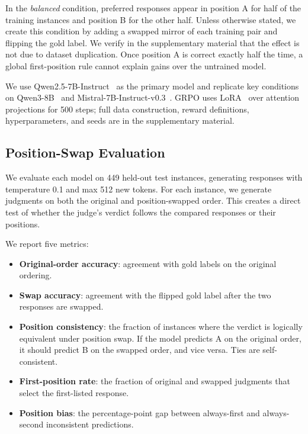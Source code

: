 \documentclass[letterpaper]{article}
\begin{document}
In the \emph{balanced} condition, preferred responses appear in position A for half of the training instances and position B for the other half. Unless otherwise stated, we create this condition by adding a swapped mirror of each training pair and flipping the gold label. We verify in the supplementary material that the effect is not due to dataset duplication. Once position A is correct exactly half the time, a global first-position rule cannot explain gains over the untrained model.

We use Qwen2.5-7B-Instruct~\citep{qwen2025qwen25} as the primary model and replicate key conditions on Qwen3-8B~\citep{qwen2025qwen3} and Mistral-7B-Instruct-v0.3~\citep{jiang2023mistral}. GRPO uses LoRA~\citep{hu2022lora} over attention projections for 500 steps; full data construction, reward definitions, hyperparameters, and seeds are in the supplementary material.

\subsection{Position-Swap Evaluation}

We evaluate each model on 449 held-out test instances, generating responses with temperature 0.1 and max 512 new tokens. For each instance, we generate judgments on both the original and position-swapped order. This creates a direct test of whether the judge's verdict follows the compared responses or their positions.

We report five metrics:
\begin{itemize}
\item \textbf{Original-order accuracy}: agreement with gold labels on the original ordering.
\item \textbf{Swap accuracy}: agreement with the flipped gold label after the two responses are swapped.
\item \textbf{Position consistency}: the fraction of instances where the verdict is logically equivalent under position swap. If the model predicts A on the original order, it should predict B on the swapped order, and vice versa. Ties are self-consistent.
\item \textbf{First-position rate}: the fraction of original and swapped judgments that select the first-listed response.
\item \textbf{Position bias}: the percentage-point gap between always-first and always-second inconsistent predictions.
\end{itemize}
\end{document}
